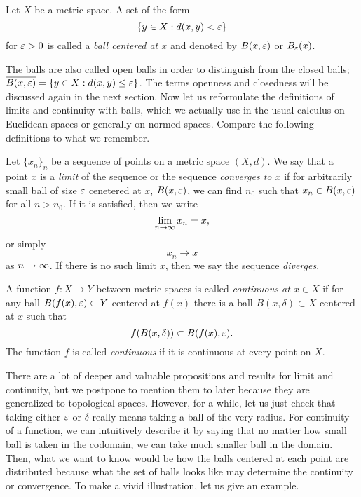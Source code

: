 \documentclass{../crs}
\begin{document}
\begin{defn}
Let $X$ be a metric space.
A set of the form 
\[\{y\in X:d(x,y)<\varepsilon\}\]
for $\varepsilon>0$ is called a \emph{ball centered at $x$} and denoted by $B(x,\varepsilon)$ or $B_\varepsilon(x)$.
\end{defn}

The balls are also called open balls in order to distinguish from the closed balls; $\overline{B(x,\varepsilon)}=\{y\in X:d(x,y)\le\varepsilon\}$.
The terms openness and closedness will be discussed again in the next section.
Now let us reformulate the definitions of limits and continuity with balls, which we actually use in the usual calculus on Euclidean spaces or generally on normed spaces.
Compare the following definitions to what we remember.

\begin{defn}
Let $\{x_n\}_n$ be a sequence of points on a metric space $(X,d)$.
We say that a point $x$ is a \emph{limit} of the sequence or the sequence \emph{converges to $x$} if for arbitrarily small ball of size $\varepsilon$ cenetered at $x$, $B(x,\varepsilon)$, we can find $n_0$ such that $x_n\in B(x,\varepsilon)$ for all $n>n_0$.
If it is satisfied, then we write
\[\lim_{n\to\oo}x_n=x,\]
or simply
\[x_n\to x\]
as $n\to\oo$.
If there is no such limit $x$, then we say the sequence \emph{diverges}.
\end{defn}
\begin{defn}
A function $f:X\to Y$ between metric spaces is called \emph{continuous at $x\in X$} if for any ball $B(f(x),\varepsilon)\subset Y$ centered at $f(x)$ there is a ball $B(x,\delta)\subset X$ centered at $x$ such that
\[f(B(x,\delta))\subset B(f(x),\varepsilon).\]
The function $f$ is called \emph{continuous} if it is continuous at every point on $X$.
\end{defn}

There are a lot of deeper and valuable propositions and results for limit and continuity, but we postpone to mention them to later because they are generalized to topological spaces.
However, for a while, let us just check that taking either $\varepsilon$ or $\delta$ really means taking a ball of the very radius.
For continuity of a function, we can intuitively describe it by saying that no matter how small ball is taken in the codomain, we can take much smaller ball in the domain.
Then, what we want to know would be how the balls centered at each point are distributed because what the set of balls looks like may determine the continuity or convergence.
To make a vivid illustration, let us give an example.
\end{document}
